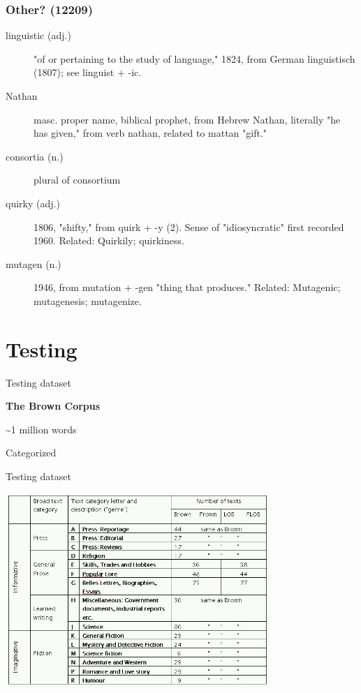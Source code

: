 \documentclass[10pt]{beamer}
\begin{document}
\begin{frame}[fragile]
  \frametitle{Other? (12209)}

  \begin{description}
    \item[linguistic (adj.)] "of or pertaining to the study of language," 1824, from German linguistisch (1807); see linguist + -ic. 
    \item[Nathan] masc. proper name, biblical prophet, from Hebrew Nathan, literally "he has given," from verb nathan, related to mattan "gift."
    \item[consortia (n.)] plural of consortium
    \item[quirky (adj.)] 1806, "shifty," from quirk + -y (2). Sense of "idiosyncratic" first recorded 1960. Related: Quirkily; quirkiness.
    \item[mutagen (n.)] 1946, from mutation + -gen "thing that produces." Related: Mutagenic; mutagenesis; mutagenize.




  \end{description}
\end{frame}

\section{Testing}

\begin{frame}[fragile]{Testing dataset}
  \pause

  \textbf{The Brown Corpus}

  \pause

  \textasciitilde 1 million words

  \pause

  Categorized
\end{frame}

\begin{frame}[fragile]{Testing dataset}
    \centerline{\includegraphics[width=10cm]{browncats.jpg}}

\end{frame}
\end{document}
